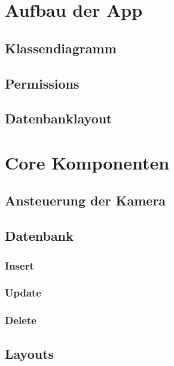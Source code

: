 \newpage
\section{Aufbau der App}

\subsection{Klassendiagramm}

\subsection{Permissions}

\subsection{Datenbanklayout}

\section{Core Komponenten}


\subsection{Ansteuerung der Kamera}


\subsection{Datenbank}



\subsubsection{Insert}


\subsubsection{Update}



\subsubsection{Delete}



\subsection{Layouts}